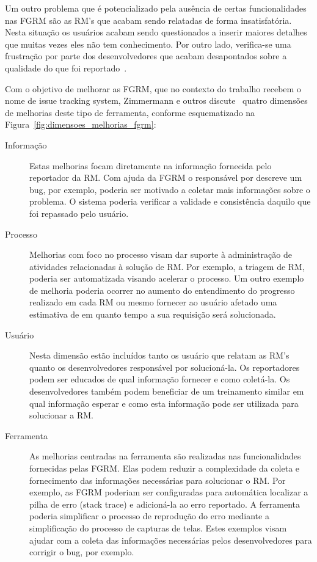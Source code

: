 Um outro problema que é potencializado pela ausência de certas funcionalidades
nas FGRM são as RM's que acabam sendo relatadas de forma insatisfatória. Nesta
situação os usuários acabam sendo questionados a inserir maiores detalhes que
muitas vezes eles não tem conhecimento. Por outro lado, verifica-se uma
frustração por parte dos desenvolvedores que acabam desapontados sobre a
qualidade do que foi reportado~\cite{just2008towards}.

Com o objetivo de melhorar as FGRM, que no contexto do trabalho recebem o nome
de issue tracking system, Zimmermann e outros
discute~\cite{zimmermann2009improving} quatro dimensões de melhorias deste tipo
de ferramenta, conforme esquematizado na
Figura~\ref{fig:dimensoes_melhorias_fgrm}:

\begin{description}
	\item[Informação] Estas melhorias focam diretamente na informação fornecida
		pelo reportador da RM\@. Com ajuda da FGRM o responsável por descreve um
		bug, por exemplo, poderia ser motivado a coletar mais informações sobre o
		problema. O sistema poderia verificar a validade e consistência daquilo
		que foi repassado pelo usuário.
   \item[Processo] Melhorias com foco no processo visam dar suporte à
	   administração de atividades relacionadas à solução de RM\@. Por exemplo,
	   a triagem de RM, poderia ser automatizada visando acelerar o processo. Um
	   outro exemplo de melhoria poderia ocorrer no aumento do entendimento do
	   progresso realizado em cada RM ou mesmo fornecer ao usuário afetado uma
	   estimativa de em quanto tempo a sua requisição será solucionada.
	\item[Usuário] Nesta dimensão estão incluídos tanto os usuário que relatam
		as RM's quanto os desenvolvedores responsável por solucioná-la. Os
		reportadores podem ser educados de qual informação fornecer e como
		coletá-la. Os desenvolvedores também podem beneficiar de um treinamento
		similar em qual informação esperar e como esta informação pode ser
		utilizada para solucionar a RM\@.
	\item[Ferramenta] As melhorias centradas na ferramenta são realizadas nas
		funcionalidades fornecidas pelas FGRM\@. Elas podem reduzir a
		complexidade da coleta e fornecimento das informações necessárias para
		solucionar o RM\@. Por exemplo, as FGRM poderiam ser configuradas para
		automática localizar a pilha de erro (stack trace) e adicioná-la ao erro
		reportado.  A ferramenta poderia simplificar o processo de reprodução do
		erro mediante a simplificação do processo de capturas de telas. Estes
		exemplos visam ajudar com a coleta das informações necessárias pelos
		desenvolvedores para corrigir o bug, por exemplo.
\end{description}

